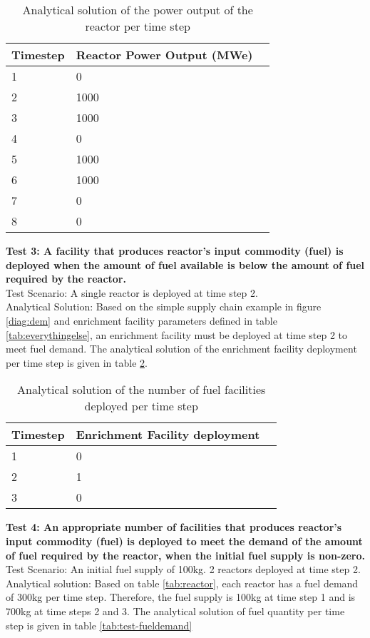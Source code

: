 \documentclass[11pt,letterpaper]{article}
\begin{document}
\begin{table}[H]
     \centering
    \begin{tabularx}{\textwidth}{bbb}
       \hline
       Timestep & Reactor Power Output (MWe) \\
       \hline
       1 & 0 \\
       2 & 1000 \\
       3 & 1000 \\
       4 & 0 \\
       5 & 1000 \\
       6 & 1000 \\
       7 & 0 \\
       8 & 0 \\
       \hline
    \end{tabularx}
    \caption {Analytical solution of the power output of the reactor per time step}
    \label{tab:test-cycles}
\end{table}

\noindent
\textbf{Test 3: A facility that produces reactor’s input commodity (fuel) is deployed when the amount of fuel available is below the amount of fuel required by the reactor.} \\
Test Scenario: A single reactor is deployed at time step 2.\\
Analytical Solution: Based on the simple supply chain example in figure \ref{diag:dem} and enrichment facility parameters defined in table \ref{tab:everythingelse}, an enrichment facility must be deployed at time step 2 to meet fuel demand. The analytical solution of the enrichment facility deployment per time step is given in table \ref{tab:test-fuel}.

\begin{table}[H]
     \centering
    \begin{tabularx}{\textwidth}{bbb}
       \hline
       Timestep & Enrichment Facility deployment  \\
       \hline
       1 & 0 \\
       2 & 1 \\
       3 & 0\\
       \hline
    \end{tabularx}
    \caption {Analytical solution of the number of fuel facilities deployed per time step}
    \label{tab:test-fuel}
\end{table}

\noindent
\textbf{Test 4: An appropriate number of facilities that produces reactor's input commodity (fuel) is deployed to meet the demand of the amount of fuel required by the reactor, when the initial fuel supply is non-zero.} \\
Test Scenario: An initial fuel supply of 100kg. 2 reactors deployed at time step 2. \\
Analytical solution: Based on table \ref{tab:reactor}, each reactor has a fuel demand of 300kg per time step. Therefore, the fuel supply is 100kg at time step 1 and is 700kg at time steps 2 and 3. The analytical solution of fuel quantity per time step is given in table \ref{tab:test-fueldemand}  
\end{document}
